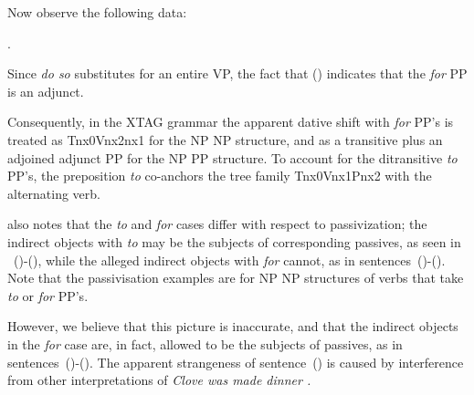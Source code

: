 \noindent Now observe the following data:


.

Since {\it do so} substitutes for an entire VP, the fact that () 
indicates that the {\it for} PP is an adjunct.

Consequently, in the XTAG grammar the apparent dative shift with {\it
for} PP's is treated as Tnx0Vnx2nx1 for the NP NP structure, and as a
transitive plus an adjoined adjunct PP for the NP PP structure.  To
account for the ditransitive {\it to} PP's, the preposition {\it to}
co-anchors the tree family Tnx0Vnx1Pnx2 with the alternating
verb. 

\cite{mccawley88} also notes that the {\it to} and {\it for} cases
differ with respect to passivization; the indirect objects with {\it to} may be
the subjects of corresponding passives, as seen in ~()-(), while
the alleged indirect objects with {\it for} cannot, as in
sentences~()-().  Note that the passivisation examples are for NP
NP structures of verbs that take {\it to} or {\it for} PP's.


However, we believe that this picture is inaccurate, and that the indirect
objects in the {\it for} case are, in fact, allowed to be the subjects of
passives, as in sentences~()-().  The apparent strangeness of
sentence~() is caused by interference from other interpretations of {\it
Clove was made dinner .}







